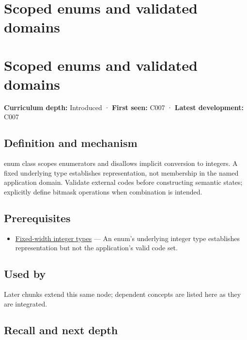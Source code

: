 \hypertarget{appendix-23640fcee147}{}
\section*{Scoped enums and validated domains}
\section{Scoped enums and validated domains}\label{appendix-23640fcee147-scoped-enums-and-validated-domains}

\textbf{Curriculum depth:} Introduced · \textbf{First seen:} C007 · \textbf{Latest development:} C007

\subsection{Definition and mechanism}\label{appendix-23640fcee147-definition-and-mechanism}

enum class scopes enumerators and disallows implicit conversion to integers. A fixed underlying type establishes representation, not membership in the named application domain. Validate external codes before constructing semantic states; explicitly define bitmask operations when combination is intended.

\subsection{Prerequisites}\label{appendix-23640fcee147-prerequisites}

\begin{itemize}
\tightlist
\item
  \hyperref[appendix-cc04044b5782]{Fixed-width integer types} --- An enum's underlying integer type establishes representation but not the application's valid code set.
\end{itemize}

\subsection{Used by}\label{appendix-23640fcee147-used-by}

Later chunks extend this same node; dependent concepts are listed here as they are integrated.

\subsection{Recall and next depth}\label{appendix-23640fcee147-recall-and-next-depth}

